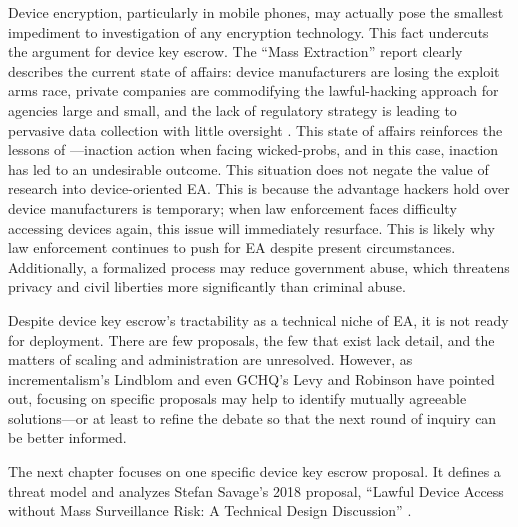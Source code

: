 Device encryption, particularly in mobile phones, may actually pose the smallest impediment to investigation of any
encryption technology. This fact undercuts the argument for device key escrow. The ``Mass Extraction'' report clearly
describes the current state of affairs: device manufacturers are losing the exploit arms race, private companies are
commodifying the \ac{lawful-hacking} approach for agencies large and small, and the lack of regulatory strategy is
leading to pervasive data collection with little oversight \cite{koepke_2020}. This state of affairs reinforces the
lessons of ---inaction  action when facing \acp{wicked-prob}, and in this case, inaction has
led to an undesirable outcome. This situation does not negate the value of research into device-oriented \ac{EA}. This
is because the advantage hackers hold over device manufacturers is temporary; when law enforcement faces difficulty
accessing devices again, this issue will immediately resurface. This is likely why law enforcement continues to push for
\ac{EA} despite present circumstances. Additionally, a formalized process may reduce government abuse, which threatens
privacy and civil liberties more significantly than criminal abuse.

Despite device key escrow's tractability as a technical niche of \ac{EA}, it is not ready for deployment. There are few
proposals, the few that exist lack detail, and the matters of scaling and administration are unresolved. However, as
\ac{incrementalism}'s Lindblom and even \ac{GCHQ}'s Levy and Robinson have pointed out, focusing on specific proposals
may help to identify mutually agreeable solutions---or at least to refine the debate so that the next round of inquiry
can be better informed.

The next chapter focuses on one specific device key escrow proposal. It defines a threat model and analyzes Stefan
Savage's 2018 proposal, ``Lawful Device Access without Mass Surveillance Risk: A Technical Design Discussion''
\cite{savage_lawful_2018}.
